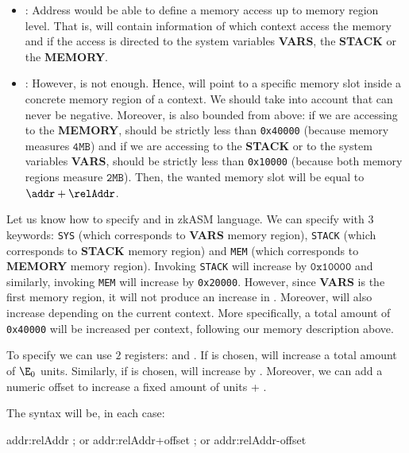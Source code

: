 \begin{itemize}

\item \addr: Address would be able to define a memory access up to memory region level. That is, \addr will contain information of which context access the memory and if the access is directed to the system variables \textbf{VARS}, the \textbf{STACK} or the \textbf{MEMORY}.

\item \relAddr: However, \addr is not enough. Hence, \relAddr will point to a specific memory slot inside a concrete memory region of a context. We should take into account that \relAddr can never be negative. Moreover, \relAddr is also bounded from above: if we are accessing to the \textbf{MEMORY}, \relAddr should be strictly less than \texttt{0x40000} (because memory measures $\texttt{4MB}$) and if we are accessing to the \textbf{STACK} or to the system variables \textbf{VARS}, \relAddr should be strictly less than \texttt{0x10000} (because both memory regions measure $\texttt{2MB}$). Then, the wanted memory slot will be equal to $\addr + \relAddr$.

\end{itemize}

Let us know how to specify \addr and \relAddr in zkASM language. We can specify \addr with $3$ keywords: \texttt{SYS} (which corresponds to \textbf{VARS} memory region), \texttt{STACK} (which corresponds to \textbf{STACK} memory region) and \texttt{MEM} (which corresponds to \textbf{MEMORY} memory region). Invoking \texttt{STACK} will increase \addr by $\texttt{0x10000}$ and similarly, invoking \texttt{MEM} will increase \addr by \texttt{0x20000}. However, since \textbf{VARS} is the first memory region, it will not produce an increase in \addr. Moreover, \addr will also increase depending on the current context. More specifically, a total amount of \texttt{0x40000} will be increased per context, following our memory description above. 

To specify \relAddr we can use $2$ registers: \E and \RR. If \E is chosen, \relAddr will increase a total amount of $\E_0$ units. Similarly, if \RR is chosen, \relAddr will increase by \RR. Moreover, we can add a numeric offset to increase a fixed amount of units \addr + \relAddr. 

The syntax will be, in each case:

\begin{zkasm}
addr:relAddr 
; or
addr:relAddr+offset
; or 
addr:relAddr-offset
\end{zkasm}

